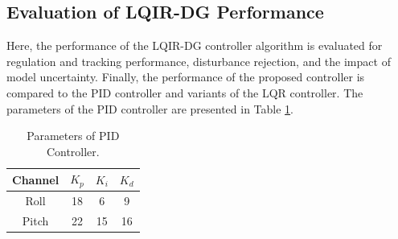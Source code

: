 \documentclass[preprint,12pt,authoryear]{elsarticle}
\begin{document}
\subsection{Evaluation of LQIR-DG Performance}
\noindent Here, the performance of the LQIR-DG controller algorithm is evaluated for regulation and tracking performance, disturbance rejection, and the impact of model uncertainty.
Finally, the performance of the proposed controller is compared to the PID controller and variants of the LQR controller. 
The parameters of the PID controller are presented in Table \ref{tab:PID_parameters}.
\begin{table}[H]
	\renewcommand{\arraystretch}{1.3}
	\caption{Parameters of PID Controller.}
	\begin{center}
		\begin{tabular}{cccc}
		\hline
		\textbf{Channel} & \textbf{$K_p$} & \textbf{$K_i$} & \textbf{$K_d$} \\
		\hline
		Roll & 18 & 6 & 9 \\
		Pitch & 22 & 15 & 16 \\
		\hline
		\end{tabular}
		\label{tab:PID_parameters}
	\end{center}
\end{table}
\end{document}
